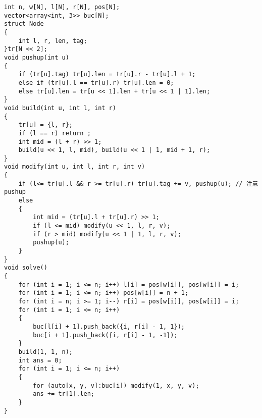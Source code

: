 \documentclass[a4paper, fontset=none]{ctexart}
\begin{document}
\begin{verbatim}
int n, w[N], l[N], r[N], pos[N];
vector<array<int, 3>> buc[N];
struct Node
{
    int l, r, len, tag;
}tr[N << 2];
void pushup(int u)
{
    if (tr[u].tag) tr[u].len = tr[u].r - tr[u].l + 1;
    else if (tr[u].l == tr[u].r) tr[u].len = 0;
    else tr[u].len = tr[u << 1].len + tr[u << 1 | 1].len;
}
void build(int u, int l, int r)
{
    tr[u] = {l, r};
    if (l == r) return ;
    int mid = (l + r) >> 1;
    build(u << 1, l, mid), build(u << 1 | 1, mid + 1, r);
}
void modify(int u, int l, int r, int v)
{
    if (l<= tr[u].l && r >= tr[u].r) tr[u].tag += v, pushup(u); // 注意 pushup
    else
    {
        int mid = (tr[u].l + tr[u].r) >> 1;
        if (l <= mid) modify(u << 1, l, r, v);
        if (r > mid) modify(u << 1 | 1, l, r, v);
        pushup(u);
    }
}
void solve()
{
    for (int i = 1; i <= n; i++) l[i] = pos[w[i]], pos[w[i]] = i;
    for (int i = 1; i <= n; i++) pos[w[i]] = n + 1;
    for (int i = n; i >= 1; i--) r[i] = pos[w[i]], pos[w[i]] = i;
    for (int i = 1; i <= n; i++)
    {
        buc[l[i] + 1].push_back({i, r[i] - 1, 1});
        buc[i + 1].push_back({i, r[i] - 1, -1});
    }
    build(1, 1, n);
    int ans = 0;
    for (int i = 1; i <= n; i++)
    {
        for (auto[x, y, v]:buc[i]) modify(1, x, y, v);
        ans += tr[1].len;
    }
}
\end{verbatim}
\end{document}
